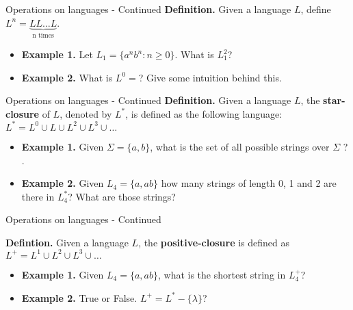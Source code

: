 \documentclass[10pt]{beamer}
\begin{document}
\begin{frame}[t]{Operations on languages - Continued}
    \textbf{Definition.} Given a language $L$, define $L^n = \underbrace{LL\dots L}_{\text{n times}}$.
    \begin{itemize}[itemsep=10mm, parsep=0pt]
        \item \textbf{Example 1.} Let $L_1 = \{a^n b^n : n \geq 0\}$. What is $L_1^2 $?
        \item \textbf{Example 2.} What is $L^0 = $?  Give some intuition behind this.
    \end{itemize}
\end{frame}

\begin{frame}[t]{Operations on languages - Continued}
    \textbf{Definition.} Given a language $L$, the \textbf{star-closure} of $L$, denoted by $L^*$, is defined as the following language: $L^* = L^0 \cup L \cup L^2 \cup L^3 \cup \dots$
    \begin{itemize}[itemsep=15mm, parsep=0pt]
        \item \textbf{Example 1.} Given $\Sigma = \{a,b\}$, what is the set of all possible strings over $\Sigma$ ? .
        \item \textbf{Example 2.} Given $L_4 = \{a,ab\}$ how many strings of length 0, 1 and 2 are there in $L_4^*$? What are those strings?

    \end{itemize}
\end{frame}

\begin{frame}[t]{Operations on languages - Continued}

    \textbf{Defintion.} Given a language $L$, the \textbf{positive-closure} is defined as $L^+ = L^1 \cup L^2 \cup L^3 \cup \dots$
    \begin{itemize}[itemsep=10mm, parsep=0pt]
        \item \textbf{Example 1.}  Given $L_4 = \{a,ab\}$, what is the shortest string in $L_4^+$?\\
        \item \textbf{Example 2.} True or False. $L^+ = L^* - \{\lambda\}$?\\

    \end{itemize}
\end{frame}
\end{document}
